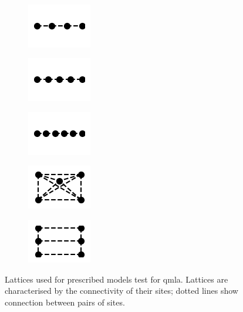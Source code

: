\begin{figure}
\begin{center}
        \\
        \begin{subfigure}{2.25cm} 
            \includegraphics{theoretical_study/lattices/_4_site_chain.png}        
            \caption{}
        \end{subfigure}
        \qquad
        \begin{subfigure}{2.25cm} 
            \includegraphics{theoretical_study/lattices/_5_site_chain.png}        
            \caption{}
        \end{subfigure}
        \qquad
        \begin{subfigure}{2.25cm} 
            \includegraphics{theoretical_study/lattices/_6_site_chain.png}        
            \caption{}
        \end{subfigure}
        \qquad
        \begin{subfigure}{2.25cm} 
            \includegraphics{theoretical_study/lattices/_5_site_lattice_fully_connected.png}        
            \caption{}
        \end{subfigure}
        \qquad
        \begin{subfigure}{2cm} 
            \includegraphics{theoretical_study/lattices/_6_site_grid.png}        
            \caption{}
        \end{subfigure}
    \end{center}
    \caption[Lattices for prescribed QMLA]{
        Lattices used for prescribed models test for \gls{qmla}.
        Lattices are characterised by the connectivity of their sites; 
            dotted lines show connection between pairs of sites.                 
    }
    \label{fig:lattices}
\end{figure}

